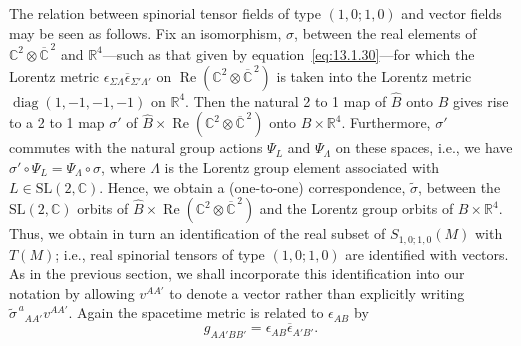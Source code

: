 The relation between spinorial tensor fields of type \((1,0;1,0)\) and vector
fields may be seen as follows. Fix an isomorphism, \(\sigma\), between the real
elements of \(\mathbb C^2\otimes\overline{\mathbb C}^{\,2}\) and \(\mathbb R^4\)---such
as that given by equation~\eqref{eq:13.1.30}---for which the Lorentz metric
\(\epsilon_{\Sigma\Lambda}\overline\epsilon_{\Sigma'\Lambda'}\) on
\(\operatorname{Re}(\mathbb C^2\otimes\overline{\mathbb C}^{\,2})\) is taken into
the Lorentz metric \(\operatorname{diag}(1,-1,-1,-1)\) on \(\mathbb R^4\). Then the
natural 2 to 1 map of \(\widehat B\) onto \(B\) gives rise to a 2 to 1 map
\(\sigma'\) of
\(\widehat B\times\operatorname{Re}(\mathbb C^2\otimes\overline{\mathbb C}^{\,2})\)
onto \(B\times\mathbb R^4\). Furthermore, \(\sigma'\) commutes with the natural
group actions \(\Psi_L\) and \(\Psi_\Lambda\) on these spaces, i.e., we have
\(\sigma'\circ\Psi_L=\Psi_\Lambda\circ\sigma\), where \(\Lambda\) is the Lorentz
group element associated with \(L\in\mathrm{SL}(2,\mathbb C)\). Hence, we obtain a
(one-to-one) correspondence, \(\widetilde\sigma\), between the
\(\mathrm{SL}(2,\mathbb C)\) orbits of
\(\widehat B\times\operatorname{Re}(\mathbb C^2\otimes\overline{\mathbb C}^{\,2})\)
and the Lorentz group orbits of \(B\times\mathbb R^4\). Thus, we obtain in turn an
identification of the real subset of \(S_{1,0;1,0}(M)\) with \(T(M)\); i.e., real
spinorial tensors of type \((1,0;1,0)\) are identified with vectors. As in the
previous section, we shall incorporate this identification into our notation by
allowing \(v^{AA'}\) to denote a vector rather than explicitly writing
\(\widetilde\sigma^{\,a}{}_{AA'}v^{AA'}\). Again the spacetime metric is related to
\(\epsilon_{AB}\) by
\begin{equation}
  g_{AA'BB'}=\epsilon_{AB}\overline\epsilon_{A'B'}.
  \tag{13.2.9}\label{eq:13.2.9}
\end{equation}

